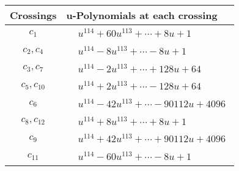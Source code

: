 \documentclass[1p]{elsarticle_modified}
\theoremstyle{definition}
\begin{document}
\begin{tabular}{m{50pt}|m{274pt}}
Crossings & \hspace{64pt}u-Polynomials at each crossing \\
\hline $$\begin{aligned}c_{1}\end{aligned}$$&$\begin{aligned}
&u^{114}+60 u^{113}+\cdots+8 u+1
\end{aligned}$\\
\hline $$\begin{aligned}c_{2},c_{4}\end{aligned}$$&$\begin{aligned}
&u^{114}-8 u^{113}+\cdots-8 u+1
\end{aligned}$\\
\hline $$\begin{aligned}c_{3},c_{7}\end{aligned}$$&$\begin{aligned}
&u^{114}-2 u^{113}+\cdots+128 u+64
\end{aligned}$\\
\hline $$\begin{aligned}c_{5},c_{10}\end{aligned}$$&$\begin{aligned}
&u^{114}+2 u^{113}+\cdots-128 u+64
\end{aligned}$\\
\hline $$\begin{aligned}c_{6}\end{aligned}$$&$\begin{aligned}
&u^{114}-42 u^{113}+\cdots-90112 u+4096
\end{aligned}$\\
\hline $$\begin{aligned}c_{8},c_{12}\end{aligned}$$&$\begin{aligned}
&u^{114}+8 u^{113}+\cdots+8 u+1
\end{aligned}$\\
\hline $$\begin{aligned}c_{9}\end{aligned}$$&$\begin{aligned}
&u^{114}+42 u^{113}+\cdots+90112 u+4096
\end{aligned}$\\
\hline $$\begin{aligned}c_{11}\end{aligned}$$&$\begin{aligned}
&u^{114}-60 u^{113}+\cdots-8 u+1
\end{aligned}$\\
\hline
\end{tabular}\\~\\
\end{document}
